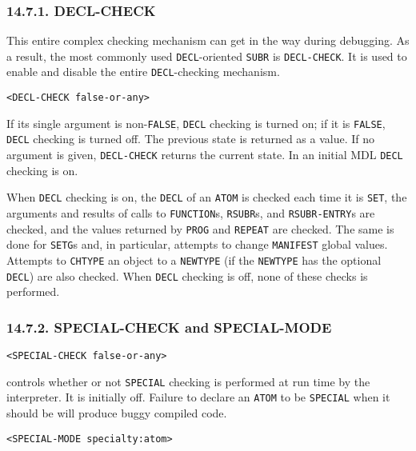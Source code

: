 \documentclass[a4paper,]{article}
\begin{document}
\subsubsection{14.7.1. DECL-CHECK}\label{decl-check}

This entire complex checking mechanism can get in the way during debugging. As a result, the most commonly used
\texttt{DECL}-oriented \texttt{SUBR} is \texttt{DECL-CHECK}. It is used to enable and
disable the entire \texttt{DECL}-checking mechanism.

\begin{verbatim}
<DECL-CHECK false-or-any>
\end{verbatim}

If its single argument is non-\texttt{FALSE}, \texttt{DECL} checking is turned on; if it is \texttt{FALSE}, \texttt{DECL}
checking is turned off. The previous state is returned as a value. If no argument is given, \texttt{DECL-CHECK} returns the
current state. In an initial MDL \texttt{DECL} checking is on.

When \texttt{DECL} checking is on, the \texttt{DECL} of an \texttt{ATOM} is checked each time it is \texttt{SET}, the
arguments and results of calls to \texttt{FUNCTION}s, \texttt{RSUBR}s, and \texttt{RSUBR-ENTRY}s are checked, and the
values returned by \texttt{PROG} and \texttt{REPEAT} are checked. The same is done for \texttt{SETG}s and, in particular,
attempts to change \texttt{MANIFEST} global values. Attempts to \texttt{CHTYPE} an object to a \texttt{NEWTYPE} (if the
\texttt{NEWTYPE} has the optional \texttt{DECL}) are also checked. When \texttt{DECL} checking is off, none of these checks
is performed.

\subsubsection{14.7.2. SPECIAL-CHECK and SPECIAL-MODE}\label{special-check-and-special-mode}

\begin{verbatim}
<SPECIAL-CHECK false-or-any>
\end{verbatim}

 controls whether or not \texttt{SPECIAL} checking is performed at run time by the
interpreter. It is initially off. Failure to declare an \texttt{ATOM} to be \texttt{SPECIAL} when it should be will produce
buggy compiled code.

\begin{verbatim}
<SPECIAL-MODE specialty:atom>
\end{verbatim}
\end{document}
